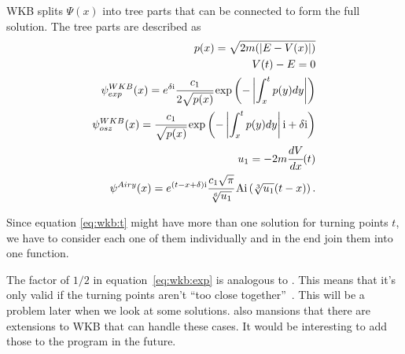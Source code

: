 \documentclass[11pt,DIV=10,final]{scrreprt} %
\newcommand{\mi}{{\text{i}}}
\begin{document}
WKB splits $\Psi(x)$ into tree parts that can be connected to form the full solution. The tree parts are described as
\begin{align}
\label{eq:wkb:momentum}
  p(x) = \sqrt{2m(|E - V(x)|)} \\
\label{eq:wkb:t}
  V(t) - E = 0 \\
\label{eq:wkb:exp}
  \psi^{WKB}_{exp}(x)= e^{\delta\mi} \cfrac{c_{1}}{2 \sqrt{p(x)}} \exp\left(-\left|\int_{x}^{t}p(y) dy\right|\right) \\
\label{eq:wkb:osz}
  \psi^{WKB}_{osz} (x)= \cfrac{c_{1}}{\sqrt{p(x)}} \exp\left(-\left|\int_{x}^{t}p(y) dy\right|\mi + \delta \mi\right) \\
  u_{1} = -2 m \cfrac{dV}{dx}(t) \\
\label{eq:airy}
  \psi^{Airy}(x) = e^{(t - x + \delta)\mi} \cfrac{c_{1} \sqrt{\pi}}{\sqrt[6]{u_{1}}} \operatorname{Ai}\left(\sqrt[3]{u_{1}} (t - x)\right).
\end{align}

Since equation \ref{eq:wkb:t} might have more than one solution for turning points $t$, we have to consider each one of them individually and in the end join them into one function.

The factor of $1/2$ in equation~\ref{eq:wkb:exp} is analogous to \citep[eq. 92]{robert2020wkb}. This means that it's only valid if the turning points aren't ``too close together''~\citep{robert2020wkb}.
This will be a problem later when we look at some solutions. \cite{robert2020wkb} also mansions that there are extensions to WKB that can handle these cases. It would be interesting to add those to the
program in the future.
\end{document}

